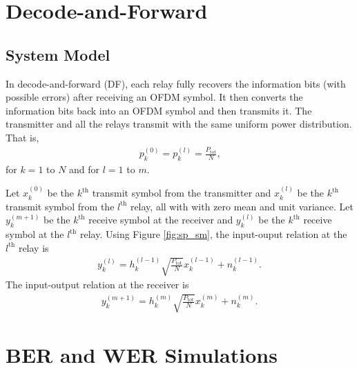 \section{Decode-and-Forward}
\label{sec:sp_df}

\subsection{System Model}
\label{subsec:sp_df_sm}

In decode-and-forward (DF), each relay fully recovers the information bits (with possible errors) after receiving an OFDM symbol.  It then converts the information bits back into an OFDM symbol and then transmits it.  The transmitter and all the relays transmit with the same uniform power distribution.  That is,
\begin{eqnarray}
p_k^{(0)} = p_k^{(l)} = \frac{P_{\mbox{tot}}}{N}\mbox{,}
\end{eqnarray}
for $k = 1$ to $N$ and for $l = 1$ to $m$.

Let $x_k^{(0)}$ be the $k^{\mbox{th}}$ transmit symbol from the transmitter and  $x_k^{(l)}$ be the $k^{\mbox{th}}$ transmit symbol from the $l^{\mbox{th}}$ relay, all with with zero mean and unit variance.  Let $y_k^{(m+1)}$ be the $k^{\mbox{th}}$ receive symbol at the receiver and  $y_k^{(l)}$ be the $k^{\mbox{th}}$ receive symbol at the $l^{\mbox{th}}$ relay.  Using Figure \ref{fig:sp_sm}, the input-ouput relation at the $l^{\mbox{th}}$ relay is
\begin{eqnarray}
y_k^{(l)} = h_k^{(l-1)} \sqrt{\frac{P_{\mbox{tot}}}{N}} x_k^{(l-1)} + n_k^{(l-1)} \mbox{.}
\end{eqnarray}
The input-output relation at the receiver is
\begin{eqnarray}
y_k^{(m+1)} =h_k^{(m)}  \sqrt{\frac{P_{\mbox{tot}}}{N}} x_k^{(m)} + n_k^{(m)} \mbox{.}
\end{eqnarray}

\section{BER and WER Simulations}
\label{sec:sp_bws}

